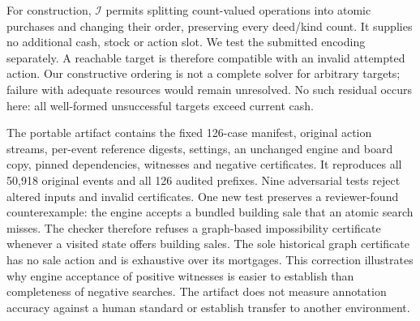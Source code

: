For construction, $\mathcal{I}$ permits splitting count-valued operations into atomic purchases and changing their order, preserving every deed/kind count. It supplies no additional cash, stock or action slot. We test the submitted encoding separately. A reachable target is therefore compatible with an invalid attempted action. Our constructive ordering is not a complete solver for arbitrary targets; failure with adequate resources would remain unresolved. No such residual occurs here: all well-formed unsuccessful targets exceed current cash.

The portable artifact contains the fixed 126-case manifest, original action streams, per-event reference digests, settings, an unchanged engine and board copy, pinned dependencies, witnesses and negative certificates. It reproduces all 50,918 original events and all 126 audited prefixes. Nine adversarial tests reject altered inputs and invalid certificates. One new test preserves a reviewer-found counterexample: the engine accepts a bundled building sale that an atomic search misses. The checker therefore refuses a graph-based impossibility certificate whenever a visited state offers building sales. The sole historical graph certificate has no sale action and is exhaustive over its mortgages. This correction illustrates why engine acceptance of positive witnesses is easier to establish than completeness of negative searches. The artifact does not measure annotation accuracy against a human standard or establish transfer to another environment.
